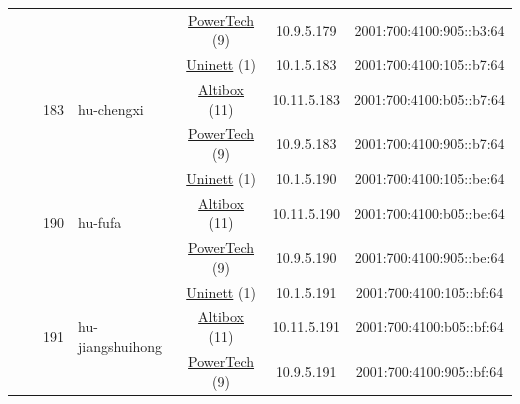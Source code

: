 \begin{small}
\begin{center}
\begin{longtable}{|c|c|c|c|c|c|c|c|}
  &  &  &  & \multicolumn{2}{|c|}{\tiny{\href{http://www.powertech.no}{PowerTech} (9)}} & \tiny{10.9.5.179} & \tiny{2001:700:4100:905::b3:64} \\* \cline{3-3}\cline{4-4}\cline{5-5}\cline{6-6}\cline{7-7}\cline{8-8}
  &  & \multirow{3}{*}{\tiny{183}} & \multicolumn{1}{|l|}{\multirow{3}{*}{\tiny{hu-chengxi}}} & \multicolumn{2}{|c|}{\tiny{\href{https://www.uninett.no}{Uninett} (1)}} & \tiny{10.1.5.183} & \tiny{2001:700:4100:105::b7:64} \\* \cline{5-5}\cline{6-6}\cline{7-7}\cline{8-8}
  &  &  &  & \multicolumn{2}{|c|}{\tiny{\href{https://www.altibox.no}{Altibox} (11)}} & \tiny{10.11.5.183} & \tiny{2001:700:4100:b05::b7:64} \\* \cline{5-5}\cline{6-6}\cline{7-7}\cline{8-8}
  &  &  &  & \multicolumn{2}{|c|}{\tiny{\href{http://www.powertech.no}{PowerTech} (9)}} & \tiny{10.9.5.183} & \tiny{2001:700:4100:905::b7:64} \\* \cline{3-3}\cline{4-4}\cline{5-5}\cline{6-6}\cline{7-7}\cline{8-8}
  &  & \multirow{3}{*}{\tiny{190}} & \multicolumn{1}{|l|}{\multirow{3}{*}{\tiny{hu-fufa}}} & \multicolumn{2}{|c|}{\tiny{\href{https://www.uninett.no}{Uninett} (1)}} & \tiny{10.1.5.190} & \tiny{2001:700:4100:105::be:64} \\* \cline{5-5}\cline{6-6}\cline{7-7}\cline{8-8}
  &  &  &  & \multicolumn{2}{|c|}{\tiny{\href{https://www.altibox.no}{Altibox} (11)}} & \tiny{10.11.5.190} & \tiny{2001:700:4100:b05::be:64} \\* \cline{5-5}\cline{6-6}\cline{7-7}\cline{8-8}
  &  &  &  & \multicolumn{2}{|c|}{\tiny{\href{http://www.powertech.no}{PowerTech} (9)}} & \tiny{10.9.5.190} & \tiny{2001:700:4100:905::be:64} \\* \cline{3-3}\cline{4-4}\cline{5-5}\cline{6-6}\cline{7-7}\cline{8-8}
  &  & \multirow{3}{*}{\tiny{191}} & \multicolumn{1}{|l|}{\multirow{3}{*}{\tiny{hu-jiangshuihong}}} & \multicolumn{2}{|c|}{\tiny{\href{https://www.uninett.no}{Uninett} (1)}} & \tiny{10.1.5.191} & \tiny{2001:700:4100:105::bf:64} \\* \cline{5-5}\cline{6-6}\cline{7-7}\cline{8-8}
  &  &  &  & \multicolumn{2}{|c|}{\tiny{\href{https://www.altibox.no}{Altibox} (11)}} & \tiny{10.11.5.191} & \tiny{2001:700:4100:b05::bf:64} \\* \cline{5-5}\cline{6-6}\cline{7-7}\cline{8-8}
  &  &  &  & \multicolumn{2}{|c|}{\tiny{\href{http://www.powertech.no}{PowerTech} (9)}} & \tiny{10.9.5.191} & \tiny{2001:700:4100:905::bf:64} \\* \cline{3-3}\cline{4-4}\cline{5-5}\cline{6-6}\cline{7-7}\cline{8-8}

\end{longtable}
\end{center}
\end{small}
